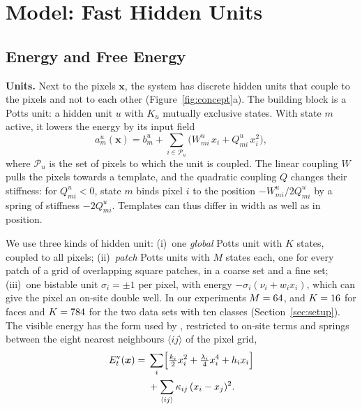 \documentclass{article}
\newif\ifshownotes
\newcommand{\budget}[1]{\ifshownotes{\noindent\small\itshape\textcolor{notegray}{[Budget: #1]}\par}\fi}
\newcommand{\x}{\bm{x}}
\newcommand{\Evis}{E^{\mathrm{v}}}
\begin{document}
\section{Model: Fast Hidden Units}
\label{sec:model}
\budget{1.1 pages}

\subsection{Energy and Free Energy}

\textbf{Units.}
Next to the pixels $\x$, the system has discrete hidden units that couple to
the pixels and not to each other (Figure~\ref{fig:concept}a). The building
block is a Potts unit: a hidden unit $u$ with $K_u$ mutually exclusive states.
With state $m$ active, it lowers the energy by its input field
\begin{equation}
  a^{u}_{m}(\x) = b^{u}_{m}
     + \sum_{i\in\mathcal{P}_u}\bigl(W^{u}_{mi}\,x_i + Q^{u}_{mi}\,x_i^{2}\bigr) ,
  \label{eq:field}
\end{equation}
where $\mathcal{P}_u$ is the set of pixels to which the unit is coupled. The
linear coupling $W$ pulls the pixels towards a template, and the quadratic
coupling $Q$ changes their stiffness: for $Q^{u}_{mi}<0$, state $m$ binds pixel
$i$ to the position $-W^{u}_{mi}/2Q^{u}_{mi}$ by a spring of stiffness
$-2Q^{u}_{mi}$. Templates can thus differ in width as well as in position.

We use three kinds of hidden unit:
(i)~one \emph{global} Potts unit with $K$ states, coupled to all pixels;
(ii)~\emph{patch} Potts units with $M$ states each, one for every patch of a
grid of overlapping square patches, in a coarse set and a fine set;
(iii)~one bistable unit $\sigma_i=\pm1$ per pixel, with energy
$-\sigma_i(\nu_i+w_ix_i)$, which can give the pixel an on-site double well.
In our experiments $M=64$, and $K=16$ for faces and
$K=784$ for the two data sets with ten classes
(Section~\ref{sec:setup}).
The visible energy has the form used by \citet{firstpaper2025}, restricted to
on-site terms and springs between the eight nearest neighbours
$\langle ij\rangle$ of the pixel grid,
\begin{align}
  \Evis_t(\x) ={}& \sum_{i}\Bigl[\tfrac{k_i}{2}x_i^{2}+\tfrac{\lambda_i}{4}x_i^{4}
                   +h_ix_i\Bigr] \nonumber\\
                 & +\sum_{\langle ij\rangle}\kappa_{ij}\,(x_i-x_j)^{2} .
  \label{eq:visible}
\end{align}
\end{document}

